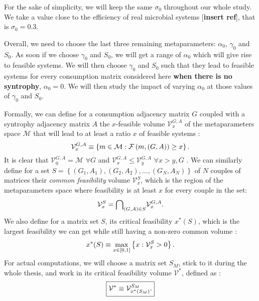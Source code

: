 \documentclass[12pt, titlepage]{report}
\begin{document}
For the sake of simplicity, we will keep the same $\sigma_0$ throughout our whole study. We take a value close to the efficiency of real microbial systems [\textbf{insert ref}], that is $\sigma_0 =0.3$.

Overall, we need to choose the last three remaining metaparameters: $\alpha_0$, $\gamma_0$ and $S_0$. As soon if we choose $\gamma_0$ and $S_0$, we will get a range of $\alpha_0$ which will give rise to feasible systems.
We will then choose $\gamma_0$ and $S_0$ such that they lead to feasible systems for every consumption matrix considered here \textbf{when there is no syntrophy}, \ie $\alpha_0=0$. We will then study the impact of varying $\alpha_0$ at those values of $\gamma_0$ and $S_0$.

Formally, we can define for a consumption adjacency matrix $G$ coupled with a syntrophy adjacency matrix $A$ the $x$-feasible volume $\mathcal{V}^{G,A}_x$ of the metaparameters space $\mathcal{M}$ that will lead to at least a ratio $x$ of feasible systems \ie :
\begin{equation}
\mathcal{V}^{G,A}_x \equiv \left\{m \in \mathcal{M} : \mathcal{F}\left(m, (G,A)\right)\geq x \right\}. \label{eq : x feasible volume}
\end{equation}
It is clear that $\mathcal{V}^{G,A}_0 = \mathcal{M}$ $\forall G$ and $\mathcal{V}^{G,A}_{x} \leq \mathcal{V}^{G,A}_{y}$ $\forall x > y, G$ . We can similarly define for a set $S = \left\{ (G_1,A_1) , (G_2, A_2), \dots, (G_N, A_N)\right\}$ of $N$ couples of matrices their \textit{common feasibility} volume $\mathcal{V}^S_x$, which is the region of the metaparameters space where feasibility is at least $x$ for every couple in the set:
\begin{equation}
\mathcal{V}^S_x = {\bigcap}_{(G,A) \in S} \mathcal{V}^{G,A}_x.
\end{equation}
We also define for a matrix set $S$, its critical feasibility $x^*(S)$, which is the largest feasibility we can get while still having a non-zero common volume :
\begin{equation}
x^*(S) \equiv \max_{x \in \left[0,1\right]}\left\{ x : \mathcal{V}^S_x > 0 \right\}.
\end{equation}
For actual computations, we will choose a matrix set $S_M$, stick to it during the whole thesis, and work in its critical feasibility volume $\mathcal{V}^*$, defined as :
\begin{equation}\boxed{
\mathcal{V}^* \equiv \mathcal{V}^{S_M}_{x^*(S_M)}.
}
\end{equation}
\end{document}
